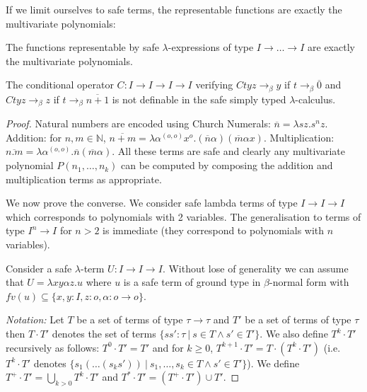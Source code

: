 \documentclass{llncs}
\newcommand{\encode}[1]{\overline{#1}}
\newcommand\union{\cup}
\newcommand\Union{\bigcup}
\newcommand\nat{\mathbb{N}}
\begin{document}
If we limit ourselves to safe terms, the representable functions are exactly the multivariate polynomials:
\begin{theorem}
\label{thm:polychar}
The functions representable by safe $\lambda$-expressions of type $I\rightarrow \ldots \rightarrow I$ are exactly the multivariate polynomials.
\end{theorem}

\begin{corollary}
The conditional operator $C:I\rightarrow I\rightarrow I \rightarrow I$ verifying  $C t y z \rightarrow_\beta y$  if $t \rightarrow_\beta \encode{0}$ and $C t y z \rightarrow_\beta z$ if $t \rightarrow_\beta \encode{n+1}$ is not definable in the safe simply typed $\lambda$-calculus.
\end{corollary}
\begin{proof}
Natural numbers are encoded using Church Numerals: $\encode{n} = \lambda s z. s^n z$. 
Addition: for $n,m \in \nat$, $\encode{n+m} = \lambda \alpha^{(o,o)} x^o . (\encode{n} \alpha) (\encode{m} \alpha x)$. Multiplication: $\encode{n . m} = \lambda \alpha^{(o,o)} . \encode{n} (\encode{m} \alpha)$.
All these terms are safe and clearly any multivariate polynomial $P(n_1, \ldots, n_k)$ can be computed by composing the addition and multiplication terms as appropriate.

We now prove the converse. We consider safe lambda terms of type $I\rightarrow I  \rightarrow I$ which corresponds to polynomials with 2 variables. The generalisation to terms of type $I^n \rightarrow I$ for $n>2$ is immediate (they correspond to polynomials with $n$ variables).
 
Consider a safe $\lambda$-term $U:I\rightarrow I\rightarrow I$. Without lose of generality we can assume that $U = \lambda x y \alpha z. u$ where $u$ is a safe term of ground type in $\beta$-normal form with $fv(u) \subseteq \{ x, y : I, z :o, \alpha : o\rightarrow o \}$.

\emph{Notation:} Let $T$ be a set of terms of type $\tau \rightarrow \tau$ and $T'$ be a set of terms of type $\tau$ then $T \cdot T'$ denotes the set of terms $\{ s s' : \tau \ | \ s \in T \wedge s' \in T' \}$. We also define 
$T^k \cdot T'$ recursively as follows:  $T^0 \cdot T' = T'$ and
for $k\geq 0$, $T^{k+1} \cdot T' = T \cdot (T^k \cdot T')$ (i.e. $T^k \cdot T'$ denotes $\{ s_1( \ldots (s_k s'))  \ | \ s_1, \ldots, s_k \in T \wedge s' \in T' \}$). We define $T^+\cdot T' = \Union_{k > 0} T^k \cdot T'$ and 
$T^*\cdot T' = (T^+\cdot T') \union T'$.


\end{proof}
\end{document}
